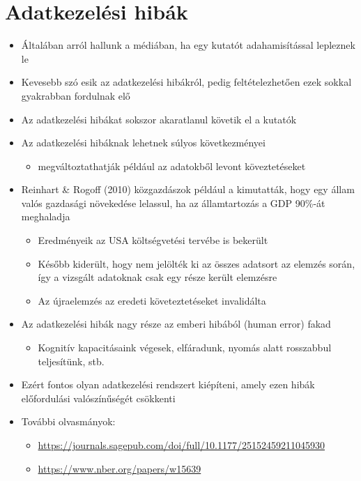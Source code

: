 \documentclass[
  letterpaper,
  DIV=11,
  numbers=noendperiod]{scrreprt}
\providecommand{\tightlist}{%
  \setlength{\itemsep}{0pt}\setlength{\parskip}{0pt}}\usepackage{longtable,booktabs,array}
\begin{document}
\hypertarget{adatkezeluxe9si-hibuxe1k}{%
\section{Adatkezelési hibák}\label{adatkezeluxe9si-hibuxe1k}}

\begin{itemize}
\item
  Általában arról hallunk a médiában, ha egy kutatót adahamisítással
  lepleznek le
\item
  Kevesebb szó esik az adatkezelési hibákról, pedig feltételezhetően
  ezek sokkal gyakrabban fordulnak elő
\item
  Az adatkezelési hibákat sokszor akaratlanul követik el a kutatók
\item
  Az adatkezelési hibáknak lehetnek súlyos következményei

  \begin{itemize}
  \tightlist
  \item
    megváltoztathatják például az adatokből levont köveztetéseket
  \end{itemize}
\item
  Reinhart \& Rogoff (2010) közgazdászok például a kimutatták, hogy egy
  állam valós gazdasági növekedése lelassul, ha az államtartozás a GDP
  90\%-át meghaladja

  \begin{itemize}
  \item
    Eredményeik az USA költségvetési tervébe is bekerült
  \item
    Később kiderült, hogy nem jelölték ki az összes adatsort az elemzés
    során, így a vizsgált adatoknak csak egy része került elemzésre
  \item
    Az újraelemzés az eredeti követeztetéseket invalidálta
  \end{itemize}
\item
  Az adatkezelési hibák nagy része az emberi hibából (human error) fakad

  \begin{itemize}
  \tightlist
  \item
    Kognitív kapacitásaink végesek, elfáradunk, nyomás alatt rosszabbul
    teljesítünk, stb.
  \end{itemize}
\item
  Ezért fontos olyan adatkezelési rendszert kiépíteni, amely ezen hibák
  előfordulási valószínűségét csökkenti
\item
  További olvasmányok:

  \begin{itemize}
  \item
    \url{https://journals.sagepub.com/doi/full/10.1177/25152459211045930}
  \item
    \url{https://www.nber.org/papers/w15639}
  \end{itemize}
\end{itemize}
\end{document}
